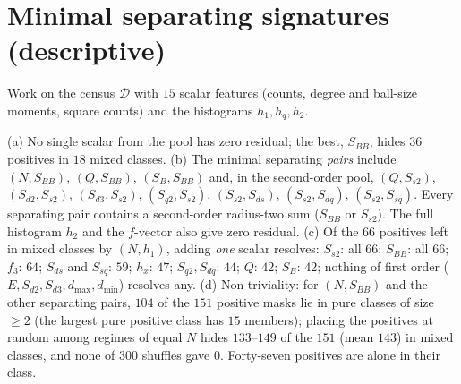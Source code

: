 \section{Minimal separating signatures (descriptive)}\label{sec:separators}
Work on the census $\mathcal D$ with $15$ scalar features (counts, degree and ball-size moments, square counts) and the histograms $h_1,h_q,h_2$.
\begin{observation}\label{obs:separators}
(a) No single scalar from the pool has zero residual; the best, $S_{BB}$, hides $36$ positives in $18$ mixed classes.
(b) The minimal separating \emph{pairs} include $(N,S_{BB})$, $(Q,S_{BB})$, $(S_B,S_{BB})$ and, in the second-order pool, $(Q,S_{s2})$, $(S_{d2},S_{s2})$, $(S_{d3},S_{s2})$, $(S_{q2},S_{s2})$, $(S_{s2},S_{ds})$, $(S_{s2},S_{dq})$, $(S_{s2},S_{sq})$. Every separating pair contains a second-order radius-two sum ($S_{BB}$ or $S_{s2}$). The full histogram $h_2$ and the $f$-vector also give zero residual.
(c) Of the $66$ positives left in mixed classes by $(N,h_1)$, adding \emph{one} scalar resolves: $S_{s2}$: all $66$; $S_{BB}$: all $66$; $f_3$: $64$; $S_{ds}$ and $S_{sq}$: $59$; $h_x$: $47$; $S_{q2},S_{dq}$: $44$; $Q$: $42$; $S_B$: $42$; nothing of first order ($E,S_{d2},S_{d3},d_{\max},d_{\min}$) resolves any.
(d) Non-triviality: for $(N,S_{BB})$ and the other separating pairs, $104$ of the $151$ positive masks lie in pure classes of size $\ge2$ (the largest pure positive class has $15$ members); placing the positives at random among regimes of equal $N$ hides $133$--$149$ of the $151$ (mean $143$) in mixed classes, and none of $300$ shuffles gave $0$. Forty-seven positives are alone in their class.
\end{observation}

